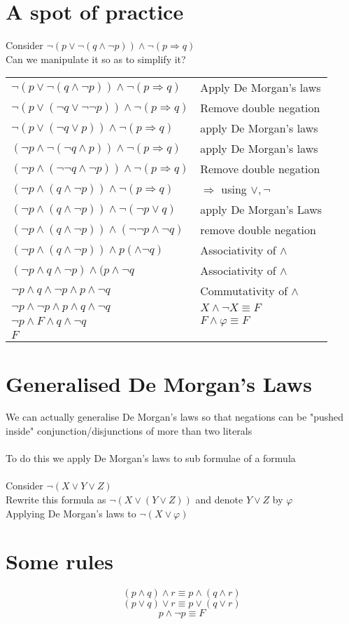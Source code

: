 \documentclass{article}[18pt]
\begin{document}
\section{A spot of practice}
Consider $\lnot(p\lor\lnot(q\land\lnot p))\land \lnot(p\Rightarrow q)$\\
Can we manipulate it so as to simplify it?\\
\begin{tabular}{l l}
$\lnot(p\lor\lnot(q\land\lnot p))\land \lnot (p\Rightarrow q)$& Apply De Morgan's laws\\
$\lnot(p\lor(\lnot q\lor \lnot\lnot p))\land \lnot(p\Rightarrow q)$&Remove double negation\\
$\lnot(p\lor(\lnot q \lor p))\land \lnot(p\Rightarrow q)$&apply De Morgan's laws\\
$(\lnot p \land \lnot(\lnot q \land p)) \land \lnot (p\Rightarrow q)$&apply De Morgan's laws\\
$(\lnot p \land (\lnot\lnot q \land \lnot p)) \land \lnot(p\Rightarrow q)$&Remove double negation\\
$(\lnot p \land (q \land \lnot p)) \land \lnot (p\Rightarrow q)$& $\Rightarrow$ using $\lor, \lnot$\\
$(\lnot p \land (q \land \lnot p)) \land \lnot(\lnot p \lor q)$& apply De Morgan's Laws\\
$(\lnot p \land (q \land \lnot p)) \land (\lnot\lnot p \land \lnot q)$&remove double negation\\
$(\lnot p \land (q \land \lnot p)) \land p(\land \lnot q)$& Associativity of $\land$\\
$(\lnot p \land q \land \lnot p) \land (p \land \lnot q$& Associativity of $\land$\\
$\lnot p \land q \land \lnot p \land p \land \lnot q$ & Commutativity of $\land$\\
$\lnot p \land \lnot p \land p \land q \land \lnot q$& $X\land \lnot X\equiv F$\\
$\lnot p \land F \land q \land \lnot q$& $F\land \varphi \equiv F$\\
$F$&
\end{tabular}
\section{Generalised De Morgan's Laws}
We can actually generalise De Morgan's laws so that negations can be "pushed inside" conjunction/disjunctions of more than two literals\\
\\
To do this we apply De Morgan's laws to sub formulae of a formula\\
\\
Consider $\lnot(X\lor Y\lor Z)$\\
Rewrite this formula as $\lnot(X\lor(Y\lor Z))$ and denote $Y\lor Z$ by $\varphi$\\
Applying De Morgan's laws to $\lnot(X\lor \varphi)$

\section{Some rules}
$$(p\land q)\land r \equiv p\land (q \land r)$$
$$(p \lor q)\lor r \equiv p \lor (q \lor r)$$
$$p \land \lnot p \equiv F$$
\end{document}
